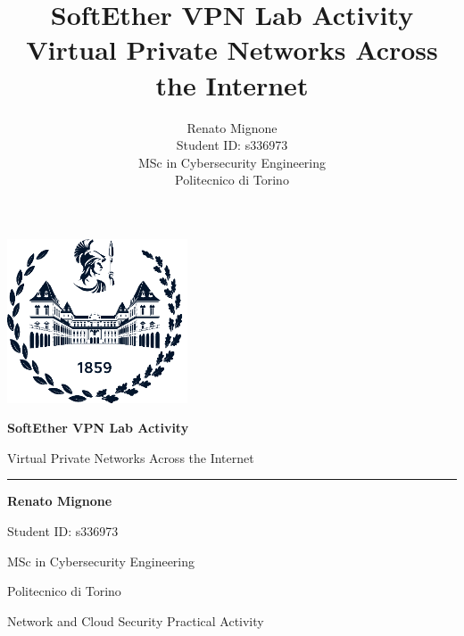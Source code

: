 \documentclass[a4paper,10pt]{article}
\title{SoftEther VPN Lab Activity\\
\large Virtual Private Networks Across the Internet}
\author{Renato Mignone\\
\small Student ID: s336973\\
\small MSc in Cybersecurity Engineering\\
\small Politecnico di Torino}
\begin{document}
\begin{titlepage}
\centering

\vspace*{2cm}

\includegraphics[width=0.4\textwidth]{../resources/General/polito_logo.png}

\vspace{1.5cm}

{\Huge \textbf{SoftEther VPN Lab Activity}}

\vspace{0.5cm}

{\LARGE Virtual Private Networks Across the Internet}

\vspace{1cm}

\rule{\textwidth}{1pt}

\vspace{2cm}

{\Large \textbf{Renato Mignone}}

\vspace{0.5cm}

{\large Student ID: s336973}

\vspace{1cm}

{\large MSc in Cybersecurity Engineering}

\vspace{0.5cm}

{\large Politecnico di Torino}

\vspace{2cm}

\vfill

{\small Network and Cloud Security Practical Activity}

\end{titlepage}



\newpage

\tableofcontents
\thispagestyle{empty}
\newpage










\newpage


\end{document}
